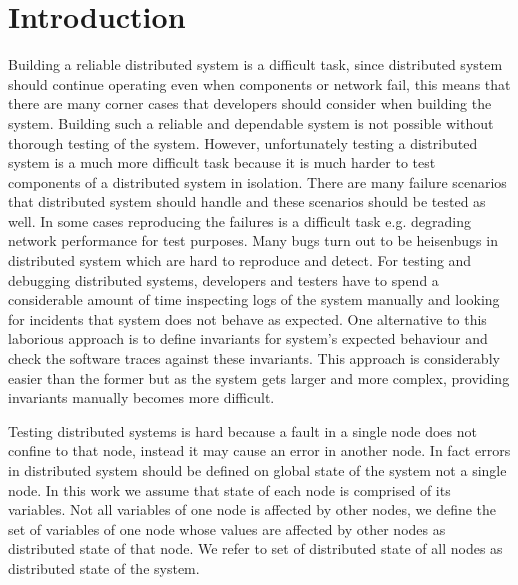 \section{Introduction}

Building a reliable distributed system is a difficult task, since distributed system should continue operating even when components or network fail, this means that there are many corner cases that developers should consider when building the system. Building such 
a reliable and dependable system is not possible without thorough testing of the system. However, unfortunately testing a distributed system is a much more difficult task because it is much harder to test components of a distributed system in isolation. There are many 
failure scenarios that distributed system should handle and these scenarios should be tested as well. In some cases reproducing the failures is a difficult task e.g. degrading network performance for test purposes. Many bugs turn out to be heisenbugs in distributed 
system which are hard to reproduce and detect. For testing and debugging distributed systems, developers and testers have to spend a considerable amount of time inspecting logs of the system manually and looking for incidents that system does not behave as 
expected. One alternative to this laborious approach is to define invariants for system's expected behaviour and check the software traces against these invariants. This approach is considerably easier than the former but as the system gets larger and more 
complex, providing invariants manually becomes more difficult.

Testing distributed systems is hard because a fault in a single node does not confine to that node, instead it may cause an error in another node. In fact errors in distributed system should be defined on global state of the system not a single node. In this work we 
assume that state of each node is comprised of its variables. Not all variables of one node is affected by other nodes, we define the set of variables of one node whose values are affected by other nodes as distributed state of that node. We refer to set of distributed 
state of all nodes as distributed state of the system.



